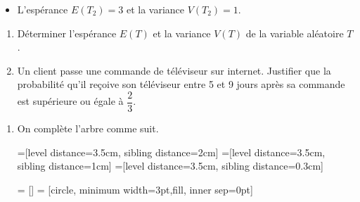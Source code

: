 \documentclass[11pt,fleqn, openany]{book} %
\begin{document}
\begin{exercise}[subtitle={(Métropole 2024, Jour 1)}]
\begin{enumerate}
\begin{itemize}
\item L'espérance $E (T_2) = 3$ et la variance $V (T_2) = 1$.
\end{itemize}
\vskip5pt
\begin{enumerate}
\item Déterminer l'espérance $E(T )$ et la variance $V (T )$ de la variable aléatoire $T$.
\item Un client passe une commande de téléviseur sur internet. Justifier que la probabilité qu'il reçoive son téléviseur entre 5 et 9 jours après sa commande est
supérieure ou égale à $\dfrac{2}{3}$.
\end{enumerate}
\end{enumerate}


\end{exercise}

\begin{solution}\hspace{0pt}
\begin{enumerate}
\item On complète l'arbre comme suit.

=[level distance=3.5cm, sibling distance=2cm]
=[level distance=3.5cm, sibling distance=1cm]
=[level distance=3.5cm, sibling distance=0.3cm]

 = []
 = [circle, minimum width=3pt,fill, inner sep=0pt]

\begin{center}
\end{center}


\end{enumerate}
\end{solution}
\end{document}

